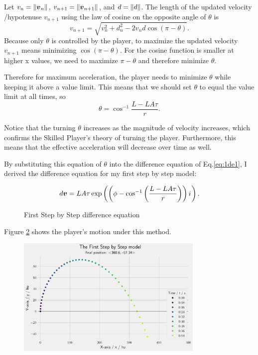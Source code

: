Let $v_n = \|\boldsymbol{v}_n\|$, $v_{n+1} = \|\boldsymbol{v}_{n+1}\|$, and $d = \|d\|$. The length of the updated velocity /hypotenuse $v_{n+1}$ using the law of cosine on the opposite angle of $\theta$ is
\[
    v_{n+1} = \sqrt{v_n^2 + d_n^2 - 2 v_n d\cos (\pi - \theta)}.
\]
Because only $\theta$ is controlled by the player, to maximize the updated velocity $v_{n+1}$ means minimizing $\cos(\pi - \theta)$. For the cosine function is smaller at higher x values, we need to maximize $\pi - \theta$ and therefore minimize $\theta$.

Therefore for maximum acceleration, the player needs to minimize $\theta$ while keeping it above a value limit. This means that we should set $\theta$ to equal the value limit at all times, so
\[
    \theta = \cos^{-1} \frac{L-LA\tau}{r}.
\]

Notice that the turning $\theta$ increases as the magnitude of velocity increases, which confirms the Skilled Player's theory of turning the player. Furthermore, this means that the effective acceleration will decrease over time as well.

By substituting this equation of $\theta$ into the difference equation of Eq.\ref{eq:1de1}, I derived the difference equation for my first step by step model:
\begin{figure}[H]
    \centering
    \[
        d\boldsymbol{v} = LA\tau \exp\left(\left(\phi - \cos^{-1}\left(\frac{L-LA\tau}{r}\right)\right) {i\mkern1mu}\right).
    \]
    \caption{First Step by Step difference equation}
    \label{fig:sbs}
\end{figure}

Figure \ref{fig:1sbs} shows the player's motion under this method.

\begin{figure}[H]
    \centering
    \includegraphics[width=0.8\textwidth]{assets/step_by_step_1.png}
    \caption{}
    \label{fig:1sbs}
\end{figure}

